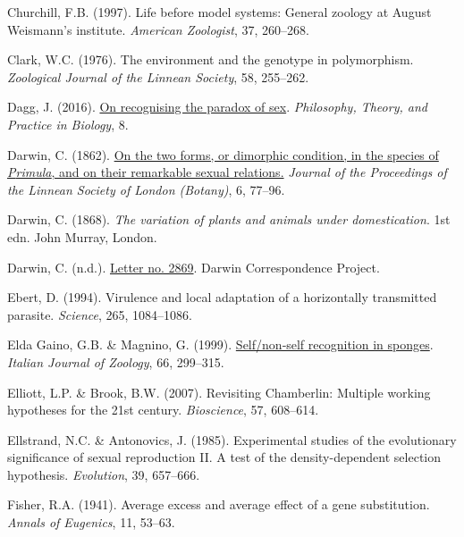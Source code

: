 \documentclass[
  letterpaper,
]{book}
\newlength{\cslhangindent}
\newenvironment{CSLReferences}[2] %
 {\begin{list}{}{%
  \setlength{\itemindent}{0pt}
  \setlength{\leftmargin}{0pt}
  \setlength{\parsep}{0pt}
  \ifodd #1
   \setlength{\leftmargin}{\cslhangindent}
   \setlength{\itemindent}{-1\cslhangindent}
  \fi
  \setlength{\itemsep}{#2\baselineskip}}}
 {\end{list}}
\begin{document}
\begin{CSLReferences}{1}{0}
Churchill, F.B. (1997). Life before model systems: General zoology at
{August Weismann's} institute. \emph{American Zoologist}, 37, 260--268.

Clark, W.C. (1976). The environment and the genotype in polymorphism.
\emph{Zoological Journal of the Linnean Society}, 58, 255--262.

Dagg, J. (2016). \href{https://doi.org/10.3998/ptb.6959004.0008.003}{On
recognising the paradox of sex}. \emph{Philosophy, Theory, and Practice
in Biology}, 8.

Darwin, C. (1862).
\href{https://doi.org/10.1111/j.1095-8312.1862.tb01218.x}{On the two
forms, or dimorphic condition, in the species of \emph{{P}rimula}, and
on their remarkable sexual relations.} \emph{Journal of the Proceedings
of the Linnean Society of London (Botany)}, 6, 77--96.

Darwin, C. (1868). \emph{The variation of plants and animals under
domestication}. 1st edn. John Murray, London.

Darwin, C. (n.d.).
\href{https://www.darwinproject.ac.uk/letter/?docId=letters/DCP-LETT-2869.xml}{Letter
no. 2869}. Darwin Correspondence Project.

Ebert, D. (1994). Virulence and local adaptation of a horizontally
transmitted parasite. \emph{Science}, 265, 1084--1086.

Elda Gaino, G.B. \& Magnino, G. (1999).
\href{https://doi.org/10.1080/11250009909356270}{Self/non‐self
recognition in sponges}. \emph{Italian Journal of Zoology}, 66,
299--315.

Elliott, L.P. \& Brook, B.W. (2007). Revisiting {C}hamberlin: Multiple
working hypotheses for the 21st century. \emph{Bioscience}, 57,
608--614.

Ellstrand, N.C. \& Antonovics, J. (1985). Experimental studies of the
evolutionary significance of sexual reproduction II. A test of the
density-dependent selection hypothesis. \emph{Evolution}, 39, 657--666.

Fisher, R.A. (1941). Average excess and average effect of a gene
substitution. \emph{Annals of Eugenics}, 11, 53--63.


\end{CSLReferences}
\end{document}
